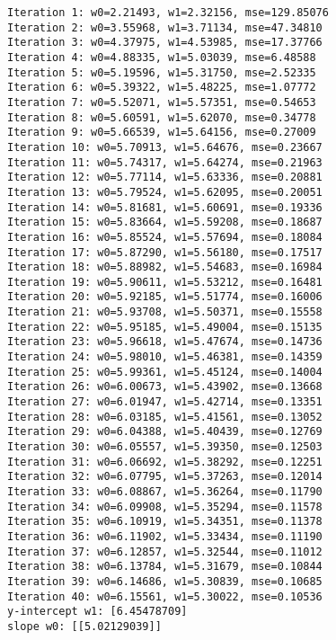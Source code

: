 \documentclass[11pt]{article}
\begin{document}
    \begin{Verbatim}[commandchars=\\\{\}]
Iteration 1: w0=2.21493, w1=2.32156, mse=129.85076
Iteration 2: w0=3.55968, w1=3.71134, mse=47.34810
Iteration 3: w0=4.37975, w1=4.53985, mse=17.37766
Iteration 4: w0=4.88335, w1=5.03039, mse=6.48588
Iteration 5: w0=5.19596, w1=5.31750, mse=2.52335
Iteration 6: w0=5.39322, w1=5.48225, mse=1.07772
Iteration 7: w0=5.52071, w1=5.57351, mse=0.54653
Iteration 8: w0=5.60591, w1=5.62070, mse=0.34778
Iteration 9: w0=5.66539, w1=5.64156, mse=0.27009
Iteration 10: w0=5.70913, w1=5.64676, mse=0.23667
Iteration 11: w0=5.74317, w1=5.64274, mse=0.21963
Iteration 12: w0=5.77114, w1=5.63336, mse=0.20881
Iteration 13: w0=5.79524, w1=5.62095, mse=0.20051
Iteration 14: w0=5.81681, w1=5.60691, mse=0.19336
Iteration 15: w0=5.83664, w1=5.59208, mse=0.18687
Iteration 16: w0=5.85524, w1=5.57694, mse=0.18084
Iteration 17: w0=5.87290, w1=5.56180, mse=0.17517
Iteration 18: w0=5.88982, w1=5.54683, mse=0.16984
Iteration 19: w0=5.90611, w1=5.53212, mse=0.16481
Iteration 20: w0=5.92185, w1=5.51774, mse=0.16006
Iteration 21: w0=5.93708, w1=5.50371, mse=0.15558
Iteration 22: w0=5.95185, w1=5.49004, mse=0.15135
Iteration 23: w0=5.96618, w1=5.47674, mse=0.14736
Iteration 24: w0=5.98010, w1=5.46381, mse=0.14359
Iteration 25: w0=5.99361, w1=5.45124, mse=0.14004
Iteration 26: w0=6.00673, w1=5.43902, mse=0.13668
Iteration 27: w0=6.01947, w1=5.42714, mse=0.13351
Iteration 28: w0=6.03185, w1=5.41561, mse=0.13052
Iteration 29: w0=6.04388, w1=5.40439, mse=0.12769
Iteration 30: w0=6.05557, w1=5.39350, mse=0.12503
Iteration 31: w0=6.06692, w1=5.38292, mse=0.12251
Iteration 32: w0=6.07795, w1=5.37263, mse=0.12014
Iteration 33: w0=6.08867, w1=5.36264, mse=0.11790
Iteration 34: w0=6.09908, w1=5.35294, mse=0.11578
Iteration 35: w0=6.10919, w1=5.34351, mse=0.11378
Iteration 36: w0=6.11902, w1=5.33434, mse=0.11190
Iteration 37: w0=6.12857, w1=5.32544, mse=0.11012
Iteration 38: w0=6.13784, w1=5.31679, mse=0.10844
Iteration 39: w0=6.14686, w1=5.30839, mse=0.10685
Iteration 40: w0=6.15561, w1=5.30022, mse=0.10536
y-intercept w1: [6.45478709]
slope w0: [[5.02129039]]
    \end{Verbatim}

    \begin{center}
    \end{center}
    { \hspace*{\fill} \\}
    
\end{document}
